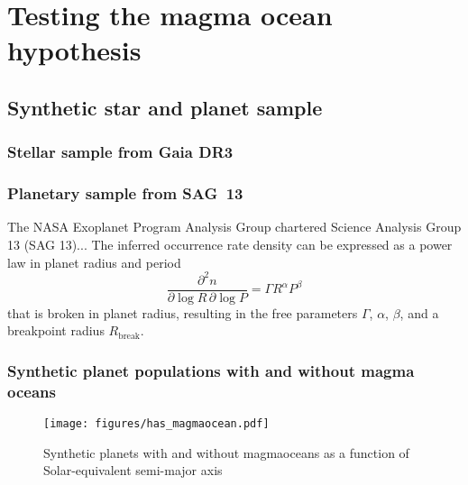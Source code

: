 \documentclass[modern]{aastex631}
\begin{document}
\section{Testing the magma ocean hypothesis}

\subsection{Synthetic star and planet sample}
\subsubsection{Stellar sample from Gaia DR3}

\subsubsection{Planetary sample from SAG~13}
\begin{note}
    The NASA Exoplanet Program Analysis Group chartered Science Analysis Group 13 (SAG 13)...
    The inferred occurrence rate density can be expressed as a power law in planet radius and period
    \begin{equation}
        \frac{\partial^2n}{\partial \log R \, \partial \log P} = \Gamma R^{\alpha} P^{\beta}
    \end{equation}
that is broken in planet radius, resulting in the free parameters $\Gamma$, $\alpha$, $\beta$, and a breakpoint radius $R_\mathrm{break}$.
\end{note}


\subsubsection{Synthetic planet populations with and without magma oceans}
\begin{figure*}
    \begin{centering}
        \texttt{[image: figures/has\_magmaocean.pdf]}
        \caption{Synthetic planets with and without magmaoceans as a function of Solar-equivalent semi-major axis}
        \label{fig:has_magmaocean}
    \end{centering}
\end{figure*}
\end{document}
